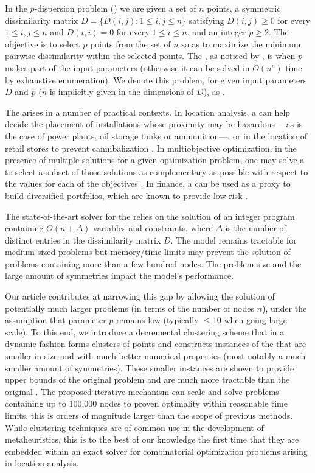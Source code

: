 \documentclass[ijoo,nonblindrev]{informs-ijoo}
\begin{document}
In the $p$-dispersion problem (\pDP{}) we are given a set of $n$ points, a symmetric dissimilarity matrix $D = \{D(i, j): 1\leq i, j\leq n\}$ satisfying $D(i, j) \geq 0$ for every $1\leq i, j\leq n$ and $D(i, i) = 0$ for every $1\leq i\leq n$, and an integer $p\geq 2$. The objective is to select $p$ points from the set of $n$ so as to maximize the minimum pairwise dissimilarity within the selected points. The \pDP{}, as noticed by \citet{Erkut1990discrete}, is \nphard{} when $p$ makes part of the input parameters (otherwise it can be solved in $O(n^p)$ time by exhaustive enumeration). We denote this problem, for given input parameters $D$ and $p$ ($n$ is implicitly given in the dimensions of $D$), as .%

The \pDP{} arises in a number of practical contexts. In location analysis, a \pDP{} can help decide the placement of installations whose proximity may be hazardous ---as is the case of power plants, oil storage tanks or ammunition---, or in the location of retail stores to prevent cannibalization \citep{Kuby1987Programming}. In multiobjective optimization, in the presence of multiple solutions for a given optimization problem, one may solve a \pDP{} to select a subset of those solutions as complementary as possible with respect to the values for each of the objectives \citep{Saboonchi2014MaxMinMin}. In finance, a \pDP{} can be used as a proxy to build diversified portfolios, which are known to provide low risk \citep{Statman1987how}.
	
The state-of-the-art solver for the \pDP{} \citep{Sayah2017new} relies on the solution of an integer program containing $O(n + \Delta)$ variables and constraints, where $\Delta$ is the number of distinct entries in the dissimilarity matrix $D$. The model remains tractable for medium-sized problems but memory/time limits may prevent the solution of problems containing more than a few hundred nodes. The problem size and the large amount of symmetries impact the model's performance. 

Our article contributes at narrowing this gap by allowing the solution of potentially much larger problems (in terms of the number of nodes $n$), under the assumption that parameter $p$ remains low (typically $\leq 10$ when going large-scale). To this end, we introduce a decremental clustering scheme that in a dynamic fashion forms clusters of points and constructs instances of the \pDP{} that are smaller in size and with much better numerical properties (most notably a much smaller amount of symmetries). These smaller instances are shown to provide upper bounds of the original problem and are much more tractable than the original \pDP{}. The proposed iterative mechanism can scale and solve problems containing up to 100,000 nodes to proven optimality within reasonable time limits, this is orders of magnitude larger than the scope of previous methods. While clustering techniques are of common use in the development of metaheuristics, this is to the best of our knowledge the first time that they are embedded within an exact solver for combinatorial optimization problems arising in location analysis.
\end{document}
